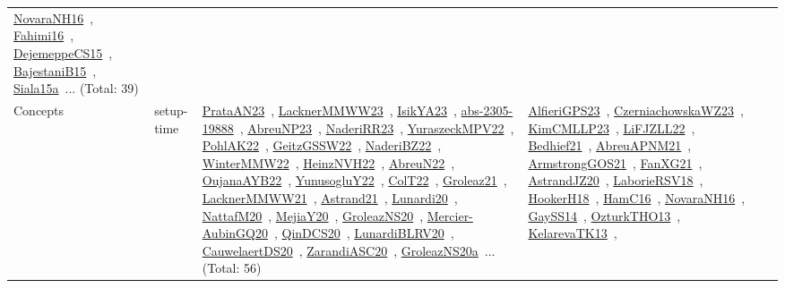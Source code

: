 {\begin{longtable}{lp{3cm}>{\raggedright\arraybackslash}p{6cm}>{\raggedright\arraybackslash}p{6cm}>{\raggedright\arraybackslash}p{8cm}}
\href{works/NovaraNH16.pdf}{NovaraNH16}~\cite{NovaraNH16}, \href{works/Fahimi16.pdf}{Fahimi16}~\cite{Fahimi16}, \href{works/DejemeppeCS15.pdf}{DejemeppeCS15}~\cite{DejemeppeCS15}, \href{works/BajestaniB15.pdf}{BajestaniB15}~\cite{BajestaniB15}, \href{works/Siala15a.pdf}{Siala15a}~\cite{Siala15a}... (Total: 39)\\
Concepts & setup-time & \href{works/PrataAN23.pdf}{PrataAN23}~\cite{PrataAN23}, \href{works/LacknerMMWW23.pdf}{LacknerMMWW23}~\cite{LacknerMMWW23}, \href{works/IsikYA23.pdf}{IsikYA23}~\cite{IsikYA23}, \href{works/abs-2305-19888.pdf}{abs-2305-19888}~\cite{abs-2305-19888}, \href{works/AbreuNP23.pdf}{AbreuNP23}~\cite{AbreuNP23}, \href{works/NaderiRR23.pdf}{NaderiRR23}~\cite{NaderiRR23}, \href{works/YuraszeckMPV22.pdf}{YuraszeckMPV22}~\cite{YuraszeckMPV22}, \href{works/PohlAK22.pdf}{PohlAK22}~\cite{PohlAK22}, \href{works/GeitzGSSW22.pdf}{GeitzGSSW22}~\cite{GeitzGSSW22}, \href{works/NaderiBZ22.pdf}{NaderiBZ22}~\cite{NaderiBZ22}, \href{works/WinterMMW22.pdf}{WinterMMW22}~\cite{WinterMMW22}, \href{works/HeinzNVH22.pdf}{HeinzNVH22}~\cite{HeinzNVH22}, \href{works/AbreuN22.pdf}{AbreuN22}~\cite{AbreuN22}, \href{works/OujanaAYB22.pdf}{OujanaAYB22}~\cite{OujanaAYB22}, \href{works/YunusogluY22.pdf}{YunusogluY22}~\cite{YunusogluY22}, \href{works/ColT22.pdf}{ColT22}~\cite{ColT22}, \href{works/Groleaz21.pdf}{Groleaz21}~\cite{Groleaz21}, \href{works/LacknerMMWW21.pdf}{LacknerMMWW21}~\cite{LacknerMMWW21}, \href{works/Astrand21.pdf}{Astrand21}~\cite{Astrand21}, \href{works/Lunardi20.pdf}{Lunardi20}~\cite{Lunardi20}, \href{works/NattafM20.pdf}{NattafM20}~\cite{NattafM20}, \href{works/MejiaY20.pdf}{MejiaY20}~\cite{MejiaY20}, \href{works/GroleazNS20.pdf}{GroleazNS20}~\cite{GroleazNS20}, \href{works/Mercier-AubinGQ20.pdf}{Mercier-AubinGQ20}~\cite{Mercier-AubinGQ20}, \href{works/QinDCS20.pdf}{QinDCS20}~\cite{QinDCS20}, \href{works/LunardiBLRV20.pdf}{LunardiBLRV20}~\cite{LunardiBLRV20}, \href{works/CauwelaertDS20.pdf}{CauwelaertDS20}~\cite{CauwelaertDS20}, \href{works/ZarandiASC20.pdf}{ZarandiASC20}~\cite{ZarandiASC20}, \href{works/GroleazNS20a.pdf}{GroleazNS20a}~\cite{GroleazNS20a}... (Total: 56) & \href{works/AlfieriGPS23.pdf}{AlfieriGPS23}~\cite{AlfieriGPS23}, \href{works/CzerniachowskaWZ23.pdf}{CzerniachowskaWZ23}~\cite{CzerniachowskaWZ23}, \href{works/KimCMLLP23.pdf}{KimCMLLP23}~\cite{KimCMLLP23}, \href{works/LiFJZLL22.pdf}{LiFJZLL22}~\cite{LiFJZLL22}, \href{works/Bedhief21.pdf}{Bedhief21}~\cite{Bedhief21}, \href{works/AbreuAPNM21.pdf}{AbreuAPNM21}~\cite{AbreuAPNM21}, \href{works/ArmstrongGOS21.pdf}{ArmstrongGOS21}~\cite{ArmstrongGOS21}, \href{works/FanXG21.pdf}{FanXG21}~\cite{FanXG21}, \href{works/AstrandJZ20.pdf}{AstrandJZ20}~\cite{AstrandJZ20}, \href{works/LaborieRSV18.pdf}{LaborieRSV18}~\cite{LaborieRSV18}, \href{works/HookerH18.pdf}{HookerH18}~\cite{HookerH18}, \href{works/HamC16.pdf}{HamC16}~\cite{HamC16}, \href{works/NovaraNH16.pdf}{NovaraNH16}~\cite{NovaraNH16}, \href{works/GaySS14.pdf}{GaySS14}~\cite{GaySS14}, \href{works/OzturkTHO13.pdf}{OzturkTHO13}~\cite{OzturkTHO13}, \href{works/KelarevaTK13.pdf}{KelarevaTK13}~\cite{KelarevaTK13}, 
\end{longtable}}
